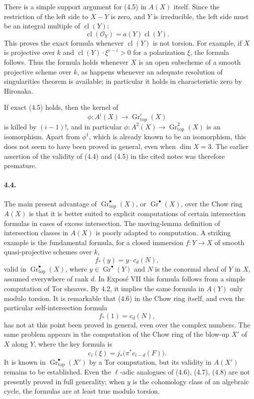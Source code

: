 \documentclass[12pt]{article}
\newcommand{\cO}{\mathcal O}
\newcommand{\Gr}{\operatorname{Gr}}
\newcommand{\cl}{\operatorname{cl}}
\newcommand{\topf}{\mathrm{top}}
\begin{document}
There is a simple support argument for (4.5) in $A(X)$ itself. Since the restriction of the left side to $X-Y$ is zero, and $Y$ is irreducible, the left side must be an integral multiple of $\cl(Y)$:
\[
\cl(\cO_Y)=a(Y)\cl(Y).
\]
This proves the exact formula whenever $\cl(Y)$ is not torsion. For example, if $X$ is projective over $k$ and $\cl(Y)\cdot \xi^{r-i}>0$ for a polarization $\xi$, the formula follows. Thus the formula holds whenever $X$ is an open subscheme of a smooth projective scheme over $k$, as happens whenever an adequate resolution of singularities theorem is available; in particular it holds in characteristic zero by Hironaka.

If exact (4.5) holds, then the kernel of
\[
\phi:A^i(X)\to \Gr^i_{\topf}(X)
\]
is killed by $(i-1)!$, and in particular $\phi:A^2(X)\to \Gr^2_{\topf}(X)$ is an isomorphism. Apart from $\phi^1$, which is already known to be an isomorphism, this does not seem to have been proved in general, even when $\dim X=3$. The earlier assertion of the validity of (4.4) and (4.5) in the cited notes was therefore premature.

\paragraph{4.4.}
The main present advantage of $\Gr^\bullet_{\topf}(X)$, or $\Gr^\bullet(X)$, over the Chow ring $A(X)$ is that it is better suited to explicit computations of certain intersection formulas in cases of excess intersection. The moving-lemma definition of intersection classes in $A(X)$ is poorly adapted to computation. A striking example is the fundamental formula, for a closed immersion $f:Y\to X$ of smooth quasi-projective schemes over $k$,
\[
f_*(y)=y\cdot c_d(N),
\tag{4.6}
\]
valid in $\Gr^\bullet_{\topf}(X)$, where $y\in \Gr^\bullet(Y)$ and $N$ is the conormal sheaf of $Y$ in $X$, assumed everywhere of rank $d$. In Exposé VII this formula follows from a simple computation of Tor sheaves. By 4.2, it implies the same formula in $A(Y)$ only modulo torsion. It is remarkable that (4.6) in the Chow ring itself, and even the particular self-intersection formula
\[
f_*(1)=c_d(N),
\tag{4.7}
\]
has not at this point been proved in general, even over the complex numbers. The same problem appears in the computation of the Chow ring of the blow-up $X'$ of $X$ along $Y$, where the key formula is
\[
c_i(\xi)=j_*\bigl(\pi^*c_{i-d}(F)\bigr).
\tag{4.8}
\]
It is known in $\Gr^\bullet_{\topf}(X')$ by a Tor computation, but its validity in $A(X')$ remains to be established. Even the $\ell$-adic analogues of (4.6), (4.7), (4.8) are not presently proved in full generality; when $y$ is the cohomology class of an algebraic cycle, the formulas are at least true modulo torsion.
\end{document}
